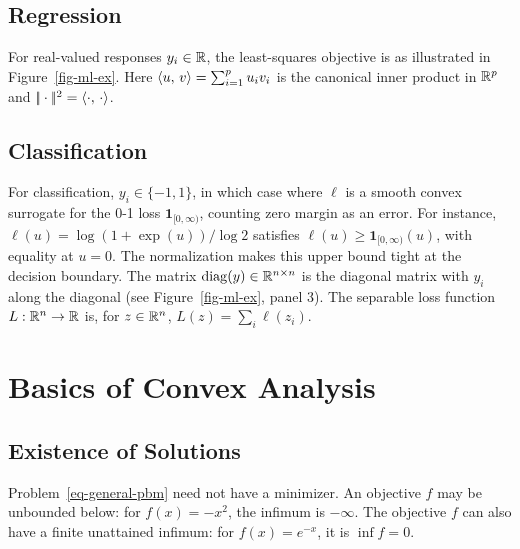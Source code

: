 \subsection{Regression}

For real-valued responses $y_i\in\mathbb{R}$, the least-squares objective is
as illustrated in Figure~\ref{fig-ml-ex}.
%
Here $\langle u,\,v\rangle=\sum_{i=1}^p u_i v_i$ is the canonical inner product in $\mathbb{R}^p$ and $|\!| \cdot |\!|^2=\langle \cdot,\,\cdot\rangle$. 


\subsection{Classification}

For classification, $y_i \in \{-1,1\}$, in which case
where $\ell$ is a smooth convex surrogate for the 0-1 loss $\mathbf{1}_{[0,\infty)}$, counting zero margin as an error.
%
For instance, $\ell(u)=\log(1+\exp(u))/\log 2$ satisfies $\ell(u)\geq\mathbf{1}_{[0,\infty)}(u)$, with equality at $u=0$. The normalization makes this upper bound tight at the decision boundary. The matrix $\operatorname{diag}(y) \in \mathbb{R}^{n \times n}$ is the diagonal matrix with $y_i$ along the diagonal (see Figure~\ref{fig-ml-ex}, panel 3). The separable loss function $L:\mathbb{R}^n\rightarrow\mathbb{R}$ is, for $z \in \mathbb{R}^n$, $L(z)=\sum_i \ell(z_i)$.


\section{Basics of Convex Analysis}

\subsection{Existence of Solutions}

Problem~\eqref{eq-general-pbm} need not have a minimizer. An objective $f$ may be unbounded below: for $f(x)=-x^2$, the infimum is $-\infty$. The objective $f$ can also have a finite unattained infimum: for $f(x)=e^{-x}$, it is $\inf f=0$.

